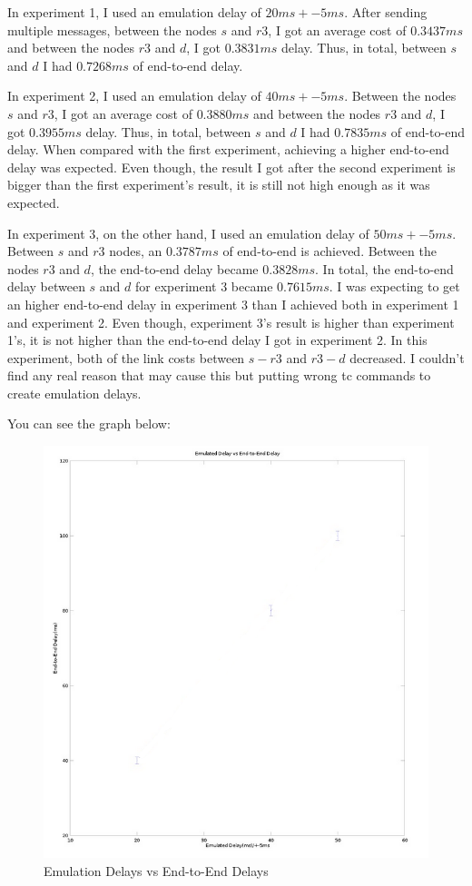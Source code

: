 \documentclass[conference]{IEEEtran}
\begin{document}
In experiment 1, I used an emulation delay of $20ms+-5ms$. After sending multiple messages, between the nodes $s$ and $r3$, I got an average cost of $0.3437ms$ and between the nodes $r3$ and $d$, I got $0.3831ms$ delay. Thus, in total, between $s$ and $d$ I had $0.7268ms$ of end-to-end delay.

In experiment 2, I used an emulation delay of $40ms+-5ms$. Between the nodes $s$ and $r3$, I got an average cost of $0.3880ms$ and between the nodes $r3$ and $d$, I got $0.3955ms$ delay. Thus, in total, between $s$ and $d$ I had $0.7835ms$ of end-to-end delay. When compared with the first experiment, achieving a higher end-to-end delay was expected. Even though, the result I got after the second experiment is bigger than the first experiment's result, it is still not high enough as it was expected.

In experiment 3, on the other hand, I used an emulation delay of $50ms+-5ms$. Between $s$ and $r3$ nodes, an $0.3787ms$ of end-to-end is achieved. Between the nodes $r3$ and $d$, the end-to-end delay became $0.3828ms$. In total, the end-to-end delay between $s$ and $d$ for experiment 3 became $0.7615ms$. I was expecting to get an higher end-to-end delay in experiment 3 than I achieved both in experiment 1 and experiment 2. Even though, experiment 3's result is higher than experiment 1's, it is not higher than the end-to-end delay I got in experiment 2. In this experiment, both of the link costs between $s-r3$ and $r3-d$ decreased. I couldn't find any real reason that may cause this but putting wrong tc commands to create emulation delays.

You can see the graph below:
\begin{figure}[h!]
  \includegraphics[width=\linewidth]{graph.png}
  \centering
  \caption{Emulation Delays vs End-to-End Delays}
  \label{fig:Topology}
\end{figure}
 
\end{document}
